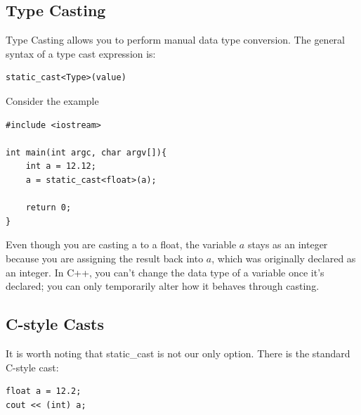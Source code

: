 \documentclass{report}
\begin{document}
    \bigbreak \noindent 
    \subsection{Type Casting}
    \bigbreak \noindent 
    \begin{concept}
 Type Casting allows you to perform manual data type conversion. The general syntax of a type cast expression is:
	\end{concept}
    \bigbreak \noindent 
    \sepline
    \begin{verbatim}
static_cast<Type>(value)
    \end{verbatim}
    \sepline
    \bigbreak \noindent 
    Consider the example
    \smallbreak \noindent
    \sepline
    \begin{verbatim}
#include <iostream>

int main(int argc, char argv[]){
    int a = 12.12;
    a = static_cast<float>(a);

    return 0;
}
    \end{verbatim}
    \sepline
    \bigbreak \noindent 
    Even though you are casting a to a float, the variable $a$ stays as an integer because you are assigning the result back into $a$, which was originally declared as an integer. In C++, you can't change the data type of a variable once it's declared; you can only temporarily alter how it behaves through casting.

    \bigbreak \noindent 
    \subsection{C-style Casts}
    \bigbreak \noindent 
    It is worth noting that static\_cast is not our only option. There is the standard C-style cast:
    \bigbreak \noindent 
    \sepline
    \begin{verbatim}
float a = 12.2;
cout << (int) a;
    \end{verbatim}
    \sepline
    
\end{document}
